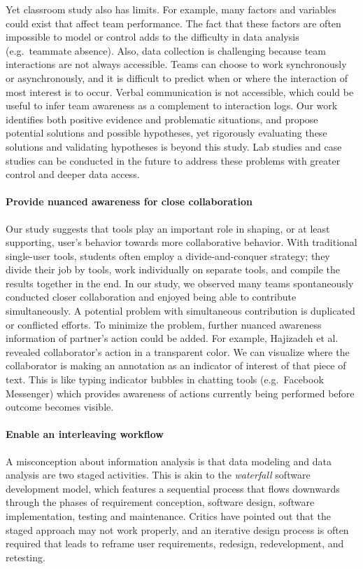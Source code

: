 Yet classroom study also has limits. For example, many factors and
variables could exist that affect team performance. The fact that these
factors are often impossible to model or control adds to the difficulty
in data analysis (e.g.~teammate absence). Also, data collection is
challenging because team interactions are not always accessible. Teams
can choose to work synchronously or asynchronously, and it is difficult
to predict when or where the interaction of most interest is to occur.
Verbal communication is not accessible, which could be useful to infer
team awareness as a complement to interaction logs. Our work identifies
both positive evidence and problematic situations, and propose potential
solutions and possible hypotheses, yet rigorously evaluating these
solutions and validating hypotheses is beyond this study. Lab studies
and case studies can be conducted in the future to address these
problems with greater control and deeper data access.

\paragraph{Provide nuanced awareness for close collaboration}
Our study suggests that tools play an important role in shaping, or at least supporting, user's
behavior towards more collaborative behavior. With traditional
single-user tools, students often employ a divide-and-conquer strategy;
they divide their job by tools, work individually on separate tools, and
compile the results together in the end. In our study, we observed many
teams spontaneously conducted closer collaboration and enjoyed being
able to contribute simultaneously. A potential problem with simultaneous
contribution is duplicated or conflicted efforts. To minimize the
problem, further nuanced awareness information of partner's action could be added. For example, Hajizadeh et al.
\cite{Hajizadeh2013} revealed collaborator's action in a transparent color. We can visualize where the collaborator is making
an annotation as an indicator of interest of that piece of text. This is
like typing indicator bubbles in chatting tools (e.g.~Facebook
Messenger) which provides awareness of actions currently being performed
before outcome becomes visible.

\paragraph{Enable an interleaving workflow}
A misconception about information analysis is that data modeling and
data analysis are two staged activities. This is akin to the \emph{waterfall}
software development model, which features a sequential process that
flows downwards through the phases of requirement conception, software
design, software implementation, testing and maintenance. Critics have
pointed out that the staged approach may not work properly, and an iterative design
process is often required that leads to reframe user requirements,
redesign, redevelopment, and retesting.

